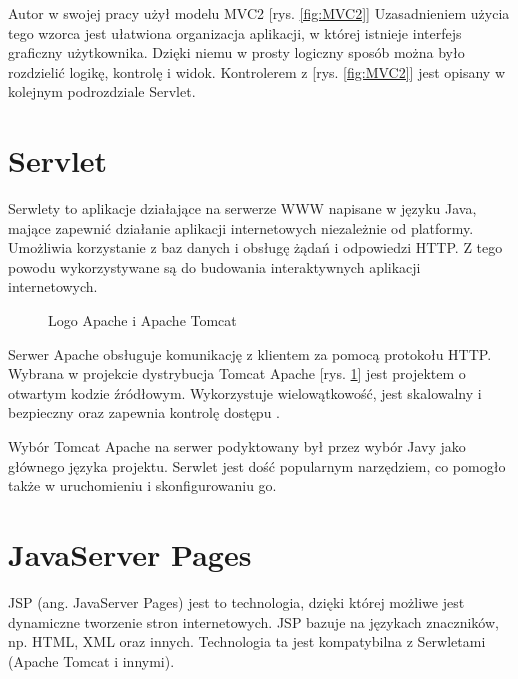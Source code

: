 \documentclass[eng,printmode,oneside]{mgr}
\begin{document}
Autor w swojej pracy użył modelu MVC2 [rys. \ref{fig:MVC2}]
Uzasadnieniem użycia tego wzorca jest ułatwiona organizacja aplikacji, w której
istnieje interfejs graficzny użytkownika. Dzięki niemu w prosty logiczny sposób
można było rozdzielić logikę, kontrolę i widok. Kontrolerem z [rys.
\ref{fig:MVC2}] jest opisany w kolejnym podrozdziale Servlet.

\newpage
\section{Servlet}

Serwlety to aplikacje działające na serwerze WWW napisane w języku Java, mające
zapewnić działanie aplikacji internetowych niezależnie od
platformy.
Umożliwia korzystanie z baz danych i obsługę żądań i odpowiedzi HTTP. Z tego
powodu wykorzystywane są do budowania interaktywnych aplikacji internetowych.

\begin{figure}
\centering
{}
\caption{\label{fig:apache}Logo Apache i Apache Tomcat \cite{apache.org,tomcat.org}}
\end{figure}

Serwer Apache obsługuje komunikację z klientem za pomocą protokołu HTTP. Wybrana
w projekcie dystrybucja Tomcat Apache [rys. \ref{fig:apache}] jest projektem o
otwartym kodzie źródłowym. Wykorzystuje wielowątkowość, jest skalowalny i
bezpieczny oraz zapewnia kontrolę dostępu \cite{apache.org}.

Wybór Tomcat Apache na serwer podyktowany był przez wybór Javy jako głównego
języka projektu. Serwlet jest dość popularnym narzędziem, co pomogło także w
uruchomieniu i skonfigurowaniu go.

\section{JavaServer Pages}

JSP (ang. JavaServer Pages) jest to technologia, dzięki której możliwe jest
dynamiczne tworzenie stron internetowych. JSP bazuje na językach znaczników,
np.
HTML, XML oraz innych. Technologia ta jest kompatybilna z Serwletami (Apache
Tomcat i innymi).
\end{document}
